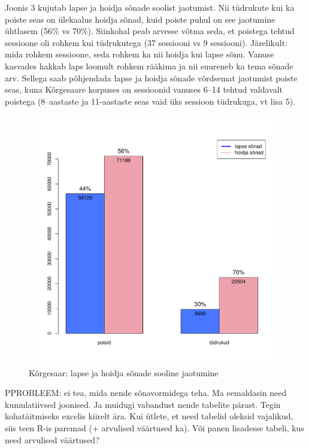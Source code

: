 \documentclass[12pt]{article}
\begin{document}
Joonis 3 kujutab lapse ja hoidja sõnade soolist jaotumist. Nii tüdrukute kui ka poiste seas on ülekaalus hoidja sõnad, kuid poiste puhul on see jaotumine ühtlasem (56\% vs 70\%). Siinkohal peab arvesse võtma seda, et poistega tehtud sessioone oli rohkem kui tüdrukutega (37 sessiooni vs 9 sessiooni). Järelikult: mida rohkem sessioone, seda rohkem ka nii hoidja kui lapse sõnu. Vanuse kasvades hakkab laps loomult rohkem rääkima ja nii suureneb ka tema sõnade arv. Sellega saab põhjendada lapse ja hoidja sõnade võrdsemat jaotumist poiste seas, kuna Kõrgesaare korpuses on sessioonid vanuses 6--14 tehtud valdavalt poistega (8--aastaste ja 11-aastaste seas vaid üks sessioon tüdrukuga, vt lisa 5).

\begin{figure}[H]
    \centering
    \includegraphics[width=12cm, height=11cm]{korgesaar_sugu_sonad}
    \caption{Kõrgesaar: lapse ja hoidja sõnade sooline jaotumine}
\end{figure}

PPROBLEEM: ei tea, mida nende sõnavormidega teha. Ma eemaldasin need kumulatiivsed joonised. Ja muidugi vabandust nende tabelite pärast. Tegin kohatäitmiseks excelis kiirelt ära. Kui ütlete, et need tabelid oleksid vajalikud, siis teen R-is paremad (+ arvulised väärtused ka). Või panen lisadesse tabeli, kus need arvulised väärtused?
\end{document}

